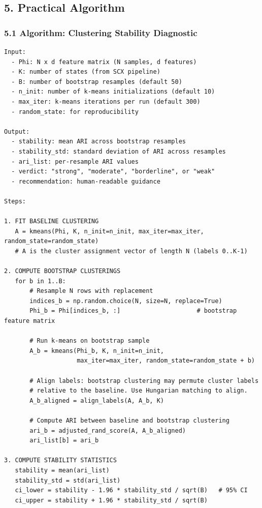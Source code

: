 \documentclass[
  12pt,
]{ctexart}
\begin{document}
\subsection{5. Practical Algorithm}\label{practical-algorithm}

\subsubsection{5.1 Algorithm: Clustering Stability
Diagnostic}\label{algorithm-clustering-stability-diagnostic}

\begin{verbatim}
Input:
  - Phi: N x d feature matrix (N samples, d features)
  - K: number of states (from SCX pipeline)
  - B: number of bootstrap resamples (default 50)
  - n_init: number of k-means initializations (default 10)
  - max_iter: k-means iterations per run (default 300)
  - random_state: for reproducibility

Output:
  - stability: mean ARI across bootstrap resamples
  - stability_std: standard deviation of ARI across resamples
  - ari_list: per-resample ARI values
  - verdict: "strong", "moderate", "borderline", or "weak"
  - recommendation: human-readable guidance

Steps:

1. FIT BASELINE CLUSTERING
   A = kmeans(Phi, K, n_init=n_init, max_iter=max_iter, random_state=random_state)
   # A is the cluster assignment vector of length N (labels 0..K-1)

2. COMPUTE BOOTSTRAP CLUSTERINGS
   for b in 1..B:
       # Resample N rows with replacement
       indices_b = np.random.choice(N, size=N, replace=True)
       Phi_b = Phi[indices_b, :]                     # bootstrap feature matrix

       # Run k-means on bootstrap sample
       A_b = kmeans(Phi_b, K, n_init=n_init,
                    max_iter=max_iter, random_state=random_state + b)

       # Align labels: bootstrap clustering may permute cluster labels
       # relative to the baseline. Use Hungarian matching to align.
       A_b_aligned = align_labels(A, A_b, K)

       # Compute ARI between baseline and bootstrap clustering
       ari_b = adjusted_rand_score(A, A_b_aligned)
       ari_list[b] = ari_b

3. COMPUTE STABILITY STATISTICS
   stability = mean(ari_list)
   stability_std = std(ari_list)
   ci_lower = stability - 1.96 * stability_std / sqrt(B)   # 95% CI
   ci_upper = stability + 1.96 * stability_std / sqrt(B)


\end{verbatim}
\end{document}
